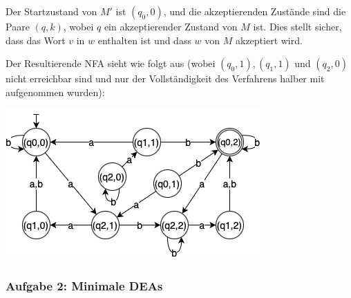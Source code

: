 \begin{teile}
	Der Startzustand von $M'$ ist $(q_0, 0)$, und die akzeptierenden Zustände sind die Paare $(q, k)$, wobei $q$ ein akzeptierender Zustand von $M$ ist. Dies stellt sicher, dass das Wort $v$ in $w$ enthalten ist und dass $w$ von $M$ akzeptiert wird.
	
	\item
	Der Resultierende NFA sieht wie folgt aus (wobei $(q_0,1), (q_1,1)$ und $(q_2,0)$ nicht erreichbar sind und nur der Vollständigkeit des Verfahrens halber mit aufgenommen wurden):

	\includegraphics[scale=0.75]{NEA-Konstruktion}  
	
\end{teile}

\newpage	
\subsubsection{Aufgabe 2: Minimale DEAs}

